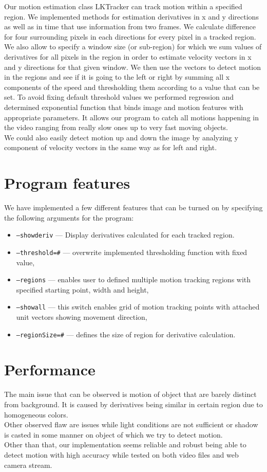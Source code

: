 \documentclass[12pt,a4paper,twocolumn]{article}
\begin{document}
Our motion estimation class LKTracker can track motion within a specified region. We implemented methods for estimation derivatives in x and y directions as well as in time that use information from two frames. We calculate difference for four 
surrounding pixels in each directions for every pixel in a tracked region. We also allow to specify a window size (or sub-region) for which we sum values of derivatives for all pixels
in the region in order to estimate velocity vectors in x and y directions for that given window. We then use the vectors to detect motion in the regions and see if it is going to the left or right by summing all x components of the speed and thresholding them according to a value that can be set.
To avoid fixing default threshold values we performed regression and determined exponential function that binds image and motion features with appropriate parameters. It allows our program to catch all motions happening in the video ranging from really slow ones up to very fast moving objects.\\
We could also easily detect motion up and down the image by analyzing y component of velocity vectors in the same way as for left and right.

\section*{Program features}
We have implemented a few different features that can be turned on by specifying the following arguments for the program:
\begin{itemize}
\item \texttt{--showderiv} --- Display derivatives calculated for each tracked region.
\item \texttt{--threshold=\textit{\#}} --- overwrite implemented thresholding function with fixed value,
\item \texttt{--regions} --- enables user to defined multiple motion tracking regions with specified starting point, width and height,
\item \texttt{--showall} --- this switch enables grid of motion tracking points with attached unit vectors showing movement direction,
\item \texttt{--regionSize=\textit{\#}} --- defines the size of region for derivative calculation.
\end{itemize}

\section*{Performance}
The main issue that can be observed is motion of object that are barely distinct from background. It is caused by derivatives being similar in certain region due to homogeneous colors.\\
Other observed flaw are issues while light conditions are not sufficient or shadow is casted in some manner on object of which we try to detect motion.\\

Other than that, our implementation seems reliable and robust being able to detect motion with high accuracy while tested on both video files and web camera stream.
\end{document}
